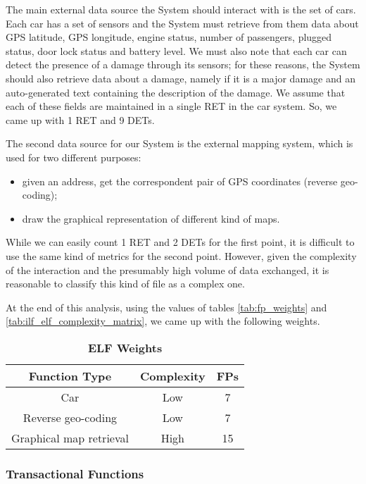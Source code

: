 The main external data source the System should interact with is the set of cars. Each car has a set of sensors and the System must retrieve from them data about GPS latitude, GPS longitude, engine status, number of passengers, plugged status, door lock status and battery level. We must also note that each car can detect the presence of a damage through its sensors; for these reasons, the System should also retrieve data about a damage, namely if it is a major damage and an auto-generated text containing the description of the damage.
We assume that each of these fields are maintained in a single RET in the car system. So, we came up with 1 RET and 9 DETs.

The second data source for our System is the external mapping system, which is used for two different purposes:
\begin{itemize}
	\item given an address, get the correspondent pair of GPS coordinates (reverse geo-coding);
	\item draw the graphical representation of different kind of maps.
\end{itemize}
While we can easily count 1 RET and 2 DETs for the first point, it is difficult to use the same kind of metrics for the second point. However, given the complexity of the interaction and the presumably high volume of data exchanged, it is reasonable to classify this kind of file as a complex one.
\bigskip

At the end of this analysis, using the values of tables \ref{tab:fp_weights} and \ref{tab:ilf_elf_complexity_matrix}, we came up with the following weights.
\begin{longtable}{| c | c | c |}
	\caption{\textbf{ELF Weights}} %
	\label{tab:elf_weights}%
	\\ \hline %
	
	\textbf{Function Type} & \textbf{Complexity} & \textbf{FPs}\\ \hline
	Car & Low & 7\\ \hline
	Reverse geo-coding & Low & 7\\ \hline
	Graphical map retrieval & High & 15\\ \hline
\end{longtable}

\subsubsection{Transactional Functions}

